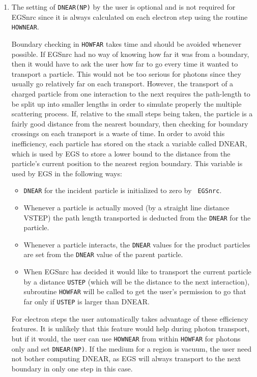 \begin{enumerate}
\item The setting of {\tt DNEAR(NP)} by the user is optional and is not required
for EGSnrc since it is always calculated on each electron
step using the routine {\tt HOWNEAR}.

Boundary checking in {\tt HOWFAR} takes time and should be avoided whenever possible. If
EGSnrc had no way of knowing how far it was from a boundary, then it would
have to ask the user how far to go every time it wanted to transport a
particle.  This would not be too serious for photons since they usually go
relatively far on each transport.  However, the transport of a charged
particle from one interaction to the next requires the path-length to be
split up into smaller lengths in order to simulate properly the multiple
scattering process.  If, relative to the small steps being taken, the
particle is a fairly good distance from the nearest boundary, then checking
for boundary crossings on each transport is a waste of time. In order to
avoid this inefficiency, each particle has stored on the stack a variable
called DNEAR, which is used by EGS to store a lower bound to the distance
from the particle's current position to the nearest region boundary.  This
variable is used by EGS in the following ways:
\begin{itemize}
\item {\tt DNEAR} for the incident particle is initialized to zero by {\tt
EGSnrc}.

\item Whenever a particle is actually moved (by a straight line distance
VSTEP) the path length transported is deducted from the {\tt DNEAR} for the
particle.
\item Whenever a particle interacts, the {\tt DNEAR} values for the product
particles are set from the {\tt DNEAR} value of the parent particle.

\item When EGSnrc has decided it would like to transport the current particle
by a distance {\tt USTEP} (which will be the distance to the next interaction),
subroutine {\tt HOWFAR} will be called to get the user's permission to go that
far only if {\tt USTEP} is larger than DNEAR.

\end{itemize}
For electron steps the user automatically takes
advantage of these efficiency features.  It is unlikely that this feature
would help during photon transport, but if it would, the user can use
{\tt HOWNEAR} from within {\tt HOWFAR} for photons only and set {\tt DNEAR(NP)}.
If the medium for a region is vacuum,
the user need not bother computing DNEAR, as EGS will always transport to
the next boundary in only one step in this case.

\end{enumerate}

